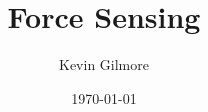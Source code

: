 \documentclass[aps,prl,preprint,groupedaddress]{revtex4-1}
\begin{document}

\title{Force Sensing}


\author{Kevin Gilmore}
\affiliation{}


\date{\today}

\begin{abstract}
\end{abstract}

\pacs{}

\maketitle

\end{document}
